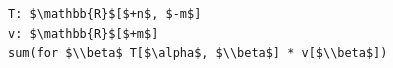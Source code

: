 \documentclass[border=10pt]{standalone}
\begin{document}
\begin{lstlisting}
T: $\mathbb{R}$[$+n$, $-m$]
v: $\mathbb{R}$[$+m$]
sum(for $\\beta$ T[$\alpha$, $\\beta$] * v[$\\beta$])
\end{lstlisting}
\end{document}
